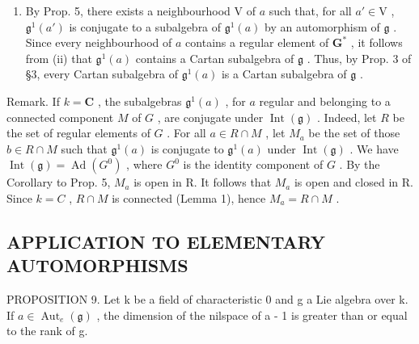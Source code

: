 \begin{enumerate}
\def\labelenumi{(\roman{enumi})}
\setcounter{enumi}{2}
\tightlist
\item
  By Prop. 5, there exists a neighbourhood \(\mathrm{V}\) of \(a\) such that, for all \(a' \in \mathrm{V}\) , \(\mathfrak{g}^1(a')\) is conjugate to a subalgebra of \(\mathfrak{g}^1(a)\) by an automorphism of \(\mathfrak{g}\) . Since every neighbourhood of \(a\) contains a regular element of \(\mathbf{G}^*\) , it follows from (ii) that \(\mathfrak{g}^1(a)\) contains a Cartan subalgebra of \(\mathfrak{g}\) . Thus, by Prop. 3 of §3, every Cartan subalgebra of \(\mathfrak{g}^1(a)\) is a Cartan subalgebra of \(\mathfrak{g}\) .
\end{enumerate}

Remark. If \(k = \mathbf{C}\) , the subalgebras \(\mathfrak{g}^1(a)\) , for \(a\) regular and belonging to a connected component \(M\) of \(G\) , are conjugate under \(\operatorname{Int}(\mathfrak{g})\) . Indeed, let \(R\) be the set of regular elements of \(G\) . For all \(a \in R \cap M\) , let \(M_a\) be the set of those \(b \in R \cap M\) such that \(\mathfrak{g}^1(a)\) is conjugate to \(\mathfrak{g}^1(a)\) under \(\operatorname{Int}(\mathfrak{g})\) . We have \(\operatorname{Int}(\mathfrak{g}) = \operatorname{Ad}(G^0)\) , where \(G^0\) is the identity component of \(G\) . By the Corollary to Prop. 5, \(M_{a}\) is open in R. It follows that \(M_{a}\) is open and closed in R. Since \(k = C\) , \(R \cap M\) is connected (Lemma 1), hence \(M_{a} = R \cap M\) .

\subsection{APPLICATION TO ELEMENTARY AUTOMORPHISMS}

PROPOSITION 9. Let k be a field of characteristic 0 and g a Lie algebra over k. If \(a \in \operatorname{Aut}_{e}(\mathfrak{g})\) , the dimension of the nilspace of a - 1 is greater than or equal to the rank of g.

